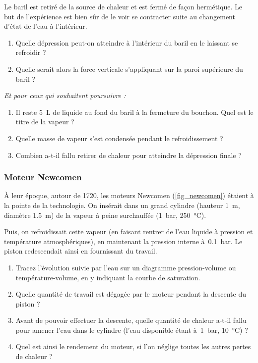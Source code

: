 	Le baril est retiré de la source de chaleur et est fermé de façon hermétique. Le but de l’expérience est bien sûr de le voir se contracter suite au changement d’état de l’eau à l’intérieur.

	\begin{enumerate}
		\item Quelle dépression peut-on atteindre à l’intérieur du baril en le laissant se refroidir ? 
		\item Quelle serait alors la force verticale s’appliquant sur la paroi supérieure du baril ?
	\end{enumerate}
	
	\textit{Et pour ceux qui souhaitent poursuivre :}
		
	\begin{enumerate}
		\item Il reste \SI{5}{\liter} de liquide au fond du baril à la fermeture du bouchon. Quel est le titre de la vapeur ?
		\item Quelle masse de vapeur s’est condensée pendant le refroidissement ?
		\item Combien a-t-il fallu retirer de chaleur pour atteindre la dépression finale ?
	\end{enumerate}

\clearpage
\subsubsection{Moteur Newcomen}

	À leur époque, autour de 1720, les moteurs Newcomen (\cref{fig_newcomen}) étaient à la pointe de la technologie. On insérait dans un grand cylindre (hauteur \SI{1}{\metre}, diamètre \SI{1.5}{\metre}) de la vapeur à peine surchauffée (\SI{1}{\bar}, \SI{250}{\degreeCelsius}).
	
	Puis, on refroidissait cette vapeur (en faisant rentrer de l’eau liquide à pression et température atmosphériques), en maintenant la pression interne à~\SI{0,1}{\bar}. Le piston redescendait ainsi en fournissant du travail.
	
	\begin{enumerate}
		\item Tracez l’évolution suivie par l’eau sur un diagramme pression-volume ou température-volume, en y indiquant la courbe de saturation.
		\item Quelle quantité de travail est dégagée par le moteur pendant la descente du piston ?
		\item Avant de pouvoir effectuer la descente, quelle quantité de chaleur a-t-il fallu pour amener l’eau dans le cylindre (l’eau disponible étant à~\SI{1}{\bar}, \SI{10}{\degreeCelsius}) ?
		\item Quel est ainsi le rendement du moteur, si l’on néglige toutes les autres pertes de chaleur ?
	\end{enumerate}

